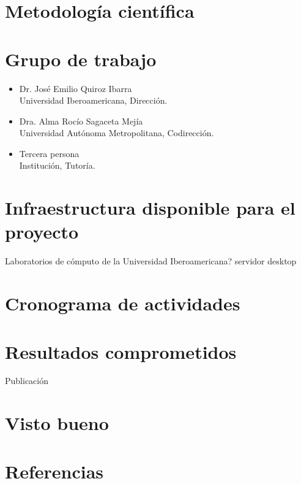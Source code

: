 \documentclass[12pt,letterpaper,final,titlepage]{article}
\begin{document}
\maketitle

\tableofcontents


%


\section {Metodología científica}
\section {Grupo de trabajo}

\begin{itemize}
	\item Dr. José Emilio Quiroz Ibarra\\
	Universidad Iberoamericana, Dirección.
	\item Dra. Alma Rocío Sagaceta Mejía\\
	Universidad Autónoma Metropolitana, Codirección.
	\item Tercera persona\\
	Institución, Tutoría.
\end{itemize}
\section {Infraestructura disponible para el proyecto}
Laboratorios de cómputo de la Universidad Iberoamericana?
servidor
desktop
\section {Cronograma de actividades}
\section {Resultados comprometidos}
Publicación
\section {Visto bueno}
\section {Referencias}
\printbibliography[heading=none]
\end{document}
